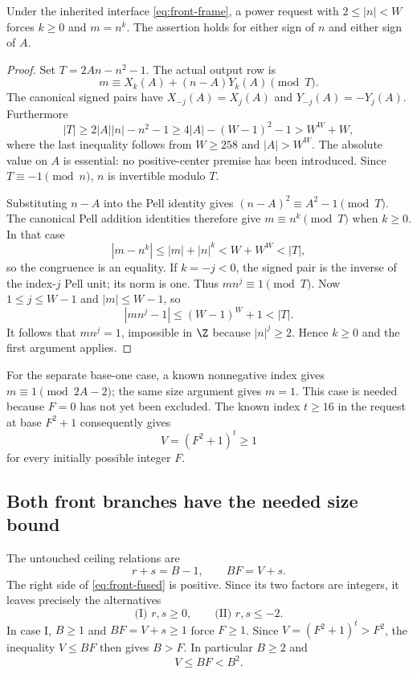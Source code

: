 \begin{lemma}
\label{lem:front-signed}
Under the inherited interface \eqref{eq:front-frame}, a power request
with $2\leq |n|<W$ forces $k\geq0$ and $m=n^k$.  The assertion holds
for either sign of $n$ and either sign of $A$.
\end{lemma}
\begin{proof}
Set $T=2An-n^2-1$.  The actual output row is
\[
 m\equiv X_k(A)+(n-A)Y_k(A)\pmod T.
\]
The canonical signed pairs have
$X_{-j}(A)=X_j(A)$ and $Y_{-j}(A)=-Y_j(A)$.
Furthermore
\[
 |T|\geq2|A||n|-n^2-1
       \geq4|A|-(W-1)^2-1>W^W+W,
\]
where the last inequality follows from $W\geq258$ and $|A|>W^W$.
The absolute value on $A$ is essential: no positive-center premise has
been introduced.  Since $T\equiv-1\pmod n$, $n$ is invertible modulo $T$.

Substituting $n-A$ into the Pell identity gives
$(n-A)^2\equiv A^2-1\pmod T$.  The canonical Pell addition identities
therefore give $m\equiv n^k\pmod T$ when $k\geq0$.  In that case
\[
 |m-n^k|\leq |m|+|n|^k<W+W^W<|T|,
\]
so the congruence is an equality.  If $k=-j<0$, the signed pair is the
inverse of the index-$j$ Pell unit; its norm is one.  Thus
$mn^j\equiv1\pmod T$.  Now $1\leq j\leq W-1$ and $|m|\leq W-1$, so
\[
 |mn^j-1|\leq(W-1)^W+1<|T|.
\]
It follows that $mn^j=1$, impossible in $\Z$ because $|n|^j\geq2$.
Hence $k\geq0$ and the first argument applies.
\end{proof}

For the separate base-one case, a known nonnegative index gives
$m\equiv1\pmod{2A-2}$; the same size argument gives $m=1$.
This case is needed because $F=0$ has not yet been excluded.  The known
index $t\geq16$ in the request at base $F^2+1$ consequently gives
\begin{equation}
 V=(F^2+1)^t\geq1
 \label{eq:front-V}
\end{equation}
for every initially possible integer $F$.

\subsection{Both front branches have the needed size bound}

The untouched ceiling relations are
\begin{equation}
 r+s=B-1,\qquad BF=V+s.
 \label{eq:front-ceiling}
\end{equation}
The right side of \eqref{eq:front-fused} is positive.  Since its two
factors are integers, it leaves precisely the alternatives
\[
 \text{(I) }r,s\geq0,
 \qquad
 \text{(II) }r,s\leq-2.
\]
In case I, $B\geq1$ and $BF=V+s\geq1$ force $F\geq1$.
Since $V=(F^2+1)^t>F^2$, the inequality $V\leq BF$ then gives
$B>F$.  In particular $B\geq2$ and
\[
 V\leq BF<B^2.
\]

